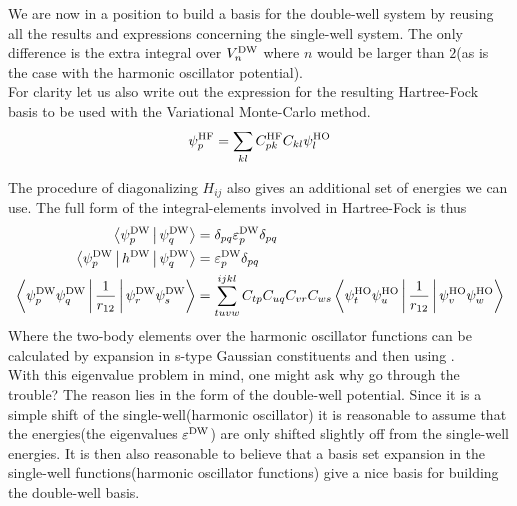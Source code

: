     We are now in a position to build a basis for the double-well system by
    reusing all the results and expressions concerning the single-well system.
    The only difference is the extra integral over $\VDW_n$ where $n$ would be
    larger than $2$(as is the case with the harmonic oscillator potential). \\

    For clarity let us also write out the expression for the resulting
    Hartree-Fock basis to be used with the Variational Monte-Carlo method.
        \begin{equation}
            \psi^{\text{HF}}_p = \sumll{kl} C^{\text{HF}}_{pk}C_{kl}\psiHO_l
        \end{equation}

    The procedure of diagonalizing $H_{ij}$ also gives an additional set of
    energies we can use. The full form of the integral-elements involved in
    Hartree-Fock is thus
        \begin{equation}
            \begin{aligned}
                \Braket{\psiDW_p|\psiDW_q} &= \delta_{pq}
                \varepsilon^{\text{DW}}_p\delta_{pq} \\
                \Braket{\psiDW_p|h^{\text{DW}}|\psiDW_q} &=
                \varepsilon^{\text{DW}}_p\delta_{pq} \\
                \Braket{\psiDW_p\psiDW_q|\frac{1}{r_{12}}|\psiDW_r\psiDW_s} &=
                \suml{tuvw}{ijkl} C_{tp}C_{uq}C_{vr}C_{ws}
                \Braket{\psiHO_t\psiHO_u|\frac{1}{r_{12}}|\psiHO_v\psiHO_w}
            \end{aligned}
        \end{equation}
    Where the two-body elements over the harmonic oscillator functions can be
    calculated by expansion in s-type Gaussian constituents and then using
    . \\

    With this eigenvalue problem in mind, one might ask why go through the
    trouble? The reason lies in the form of the double-well potential. Since it
    is a simple shift of the single-well(harmonic oscillator) it is reasonable
    to assume that the energies(the eigenvalues $\veps^{\text{DW}}$) are only
    shifted slightly off from the single-well energies. It is then also
    reasonable to believe that a basis set expansion in the single-well
    functions(harmonic oscillator functions) give a nice basis for building the
    double-well basis.

